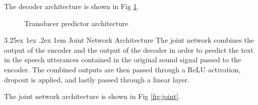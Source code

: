\documentclass{CSSRforAfrica}
\makeatletter
\renewcommand\paragraph{\@startsection{paragraph}{4}{0pt}%
  {3.25ex \@plus1ex \@minus.2ex}%
  {1em}%
  {\normalfont\normalsize\itshape}}
\makeatother
\begin{document}
The decoder architecture is shown in Fig \ref{fig:transducer-decoder}.

\begin{figure}[thb]
\begin{center}
\end{center}
\caption{Transducer predictor architecture}
\label{fig:transducer-decoder}
\end{figure}

\newpage
\paragraph{Joint Network Architecture}
The joint network combines the output of the encoder and the output of the decoder in order to predict the text in the speech utterances contained in the original sound signal passed to the encoder. The combined outputs are then passed through a ReLU activation, dropout is applied, and lastly passed through a linear layer.

The joint network architecture is shown in Fig \ref{fig:joint}.
\end{document}
